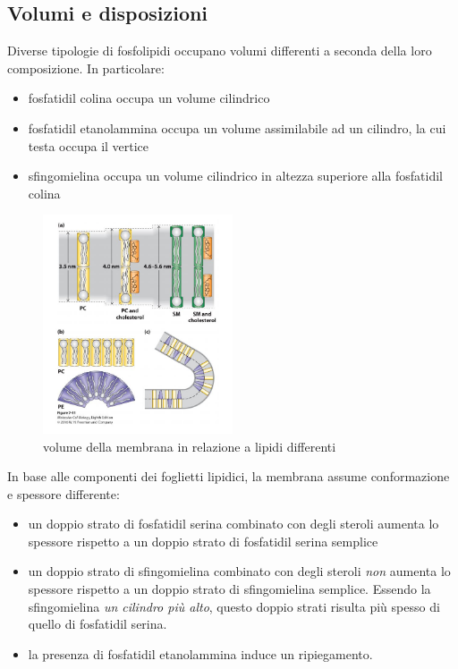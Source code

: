     \subsection{Volumi e disposizioni}
        Diverse tipologie di fosfolipidi occupano volumi differenti a seconda della loro composizione. In particolare:
        \begin{itemize}
            \item fosfatidil colina occupa un volume cilindrico
            \item fosfatidil etanolammina occupa un volume assimilabile ad un cilindro, la cui testa occupa il vertice
            \item sfingomielina occupa un volume cilindrico in altezza superiore alla fosfatidil colina
        \end{itemize}
        
        \begin{figure}[h]
            \centering
            \includegraphics[width=0.5\textwidth]{images/doppiostrato.JPG}
            \caption{\small volume della membrana in relazione a lipidi differenti}
            \label{fig:mesh1}
        \end{figure}
        
        In base alle componenti dei foglietti lipidici, la membrana assume conformazione e spessore differente:
        \begin{itemize}
            \item un doppio strato di fosfatidil serina combinato con degli steroli aumenta lo spessore rispetto a un doppio strato di fosfatidil serina semplice
            \item un doppio strato di sfingomielina combinato con degli steroli \textit{non} aumenta lo spessore rispetto a un doppio strato di sfingomielina semplice. Essendo la sfingomielina \textit{un cilindro più alto}, questo doppio strati risulta più spesso di quello di fosfatidil serina.
            \item la presenza di fosfatidil etanolammina induce un ripiegamento.
        \end{itemize}

